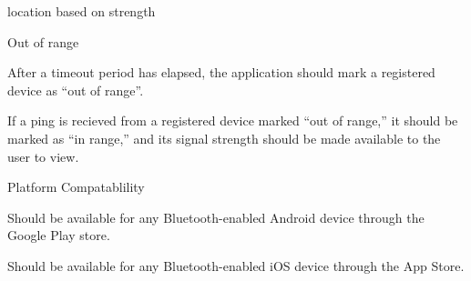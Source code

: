 \documentclass[12pt]{article}
\begin{document}
\begin{packed_enum}
\begin{packed_enum}
\begin{packed_enum}
\begin{packed_enum}
                location based on strength
        \end{packed_enum}
        \item Out of range
        \begin{packed_enum}
          \item After a timeout period has elapsed, the application should mark
                a registered device as ``out of range''.
          \item If a ping is recieved from a registered device marked ``out of
                range,'' it should be marked as ``in range,'' and its signal
                strength should be made available to the user to view. 
        \end{packed_enum}
      \end{packed_enum}
      \item Platform Compatablility
      \begin{packed_enum}
        \item Should be available for any Bluetooth-enabled Android device
              through the Google Play store.
        \item Should be available for any Bluetooth-enabled iOS device through
              the App Store.
      \end{packed_enum}
    \end{packed_enum}
  \end{packed_enum}
\end{document}
